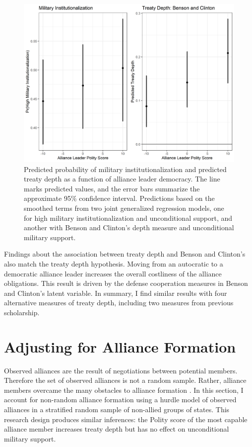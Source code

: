\documentclass[12pt]{article}
\begin{document}
\begin{figure}
\includegraphics[width=.95\textwidth]{results-alt-measures.png}  
\caption{Predicted probability of military institutionalization and predicted treaty depth as a function of alliance leader democracy. The line marks predicted values, and the error bars summarize the approximate 95\% confidence interval. Predictions based on the smoothed terms from two joint generalized regression models, one for high military institutionalization and unconditional support, and another with Benson and Clinton's depth measure and unconditional military support. }
\label{fig:results-alt-measures}
\end{figure}


Findings about the association between treaty depth and Benson and Clinton's also match the treaty depth hypothesis. 
Moving from an autocratic to a democratic alliance leader increases the overall costliness of the alliance obligations. 
This result is driven by the defense cooperation measures in Benson and Clinton's latent variable. 
In summary, I find similar results with four alternative measures of treaty depth, including two measures from previous scholarship. 


\section{Adjusting for Alliance Formation}


Observed alliances are the result of negotiations between potential members. 
Therefore the set of observed alliances is not a random sample.
Rather, alliance members overcame the many obstacles to alliance formation \citep{Poast2019a}.  
In this section, I account for non-random alliance formation using a hurdle model of observed alliances in a stratified random sample of non-allied groups of states. 
This research design produces similar inferences: the Polity score of the most capable alliance member increases treaty depth but has no effect on unconditional military support. 
\end{document}
